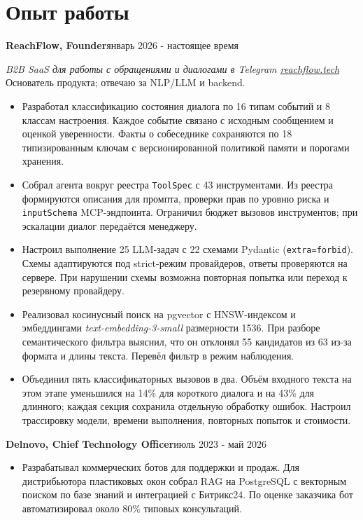 \documentclass[10pt,a4paper]{article}
\newcommand{\role}[2]{\textbf{#1}\hfill #2\par}
\begin{document}
\section{Опыт работы}
\role{ReachFlow, Founder}{январь 2026 - настоящее время}
\textit{B2B SaaS для работы с обращениями и диалогами в Telegram \textperiodcentered{} \href{https://reachflow.tech}{reachflow.tech}}
Основатель продукта; отвечаю за NLP/LLM и backend.
\begin{itemize}
  \item Разработал классификацию состояния диалога по 16 типам событий и 8 классам настроения.
        Каждое событие связано с исходным сообщением и оценкой уверенности.
        Факты о собеседнике сохраняются по 18 типизированным ключам с версионированной
        политикой памяти и порогами хранения.
  \item Собрал агента вокруг реестра \texttt{ToolSpec} с 43 инструментами.
        Из реестра формируются описания для промпта, проверки прав по уровню риска
        и \texttt{inputSchema} MCP-эндпоинта. Ограничил бюджет вызовов инструментов;
        при эскалации диалог передаётся менеджеру.
  \item Настроил выполнение 25 LLM-задач с 22 схемами Pydantic (\texttt{extra=forbid}).
        Схемы адаптируются под strict-режим провайдеров, ответы проверяются на сервере.
        При нарушении схемы возможна повторная попытка или переход к резервному провайдеру.
  \item Реализовал косинусный поиск на pgvector с HNSW-индексом и эмбеддингами
        \textit{text-embedding-3-small} размерности 1536. При разборе семантического фильтра
        выяснил, что он отклонял 55 кандидатов из 63 из-за формата и длины текста.
        Перевёл фильтр в режим наблюдения.
  \item Объединил пять классификаторных вызовов в два. Объём входного текста на этом этапе
        уменьшился на 14\% для короткого диалога и на 43\% для длинного;
        каждая секция сохранила отдельную обработку ошибок.
        Настроил трассировку модели, времени выполнения, повторных попыток и стоимости.
\end{itemize}
\vspace{2pt}

\role{Delnovo, Chief Technology Officer}{июль 2023 - май 2026}
\begin{itemize}
  \item Разрабатывал коммерческих ботов для поддержки и продаж. Для дистрибьютора пластиковых окон
        собрал RAG на PostgreSQL с векторным поиском по базе знаний и интеграцией с Битрикс24.
        По оценке заказчика бот автоматизировал около 80\% типовых консультаций.
\end{itemize}
\vspace{2pt}
\end{document}
